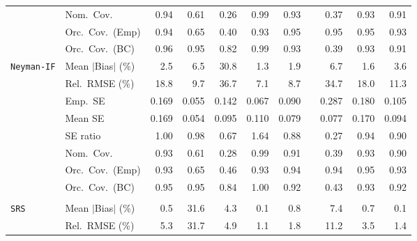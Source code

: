 \begin{landscape}
\begin{longtable}{llrrrrrrrrr}
 & Nom.\ Cov. & \cellcolor{rankone}0.94 & 0.61 & 0.26 & \cellcolor{rankthree}0.99 & \cellcolor{ranktwo}0.93 &  & 0.37 & \cellcolor{ranktwo}0.93 & \cellcolor{rankthree}0.91 \\
 & Orc.\ Cov.\ (Emp) & \cellcolor{ranktwo}0.94 & 0.65 & 0.40 & \cellcolor{rankthree}0.93 & \cellcolor{rankone}0.95 &  & \cellcolor{rankone}0.95 & \cellcolor{rankone}0.95 & \cellcolor{rankthree}0.93 \\
 & Orc.\ Cov.\ (BC) & \cellcolor{ranktwo}0.96 & \cellcolor{rankone}0.95 & 0.82 & 0.99 & \cellcolor{rankthree}0.93 &  & 0.39 & \cellcolor{rankthree}0.93 & 0.91 \\
\addlinespace[2pt]
\quad \texttt{Neyman-IF} & Mean $|$Bias$|$ (\%) & 2.5 & 6.5 & 30.8 & \cellcolor{rankone}1.3 & \cellcolor{rankthree}1.9 &  & 6.7 & \cellcolor{ranktwo}1.6 & 3.6 \\
 & Rel.\ RMSE (\%) & 18.8 & \cellcolor{rankthree}9.7 & 36.7 & \cellcolor{rankone}7.1 & \cellcolor{ranktwo}8.7 &  & 34.7 & 18.0 & 11.3 \\
 & Emp.\ SE & 0.169 & 0.055 & 0.142 & 0.067 & 0.090 &  & 0.287 & 0.180 & 0.105 \\
 & Mean SE & 0.169 & 0.054 & 0.095 & 0.110 & 0.079 &  & 0.077 & 0.170 & 0.094 \\
 & SE ratio & \cellcolor{rankone}1.00 & \cellcolor{ranktwo}0.98 & 0.67 & 1.64 & 0.88 &  & 0.27 & \cellcolor{rankthree}0.94 & 0.90 \\
 & Nom.\ Cov. & \cellcolor{rankone}0.93 & 0.61 & 0.28 & \cellcolor{ranktwo}0.99 & \cellcolor{ranktwo}0.91 &  & 0.39 & \cellcolor{rankone}0.93 & \cellcolor{rankthree}0.90 \\
 & Orc.\ Cov.\ (Emp) & \cellcolor{rankthree}0.93 & 0.65 & 0.46 & \cellcolor{rankthree}0.93 & \cellcolor{ranktwo}0.94 &  & \cellcolor{ranktwo}0.94 & \cellcolor{rankone}0.95 & \cellcolor{rankthree}0.93 \\
 & Orc.\ Cov.\ (BC) & \cellcolor{rankone}0.95 & \cellcolor{rankone}0.95 & 0.84 & 1.00 & \cellcolor{rankthree}0.92 &  & 0.43 & \cellcolor{ranktwo}0.93 & \cellcolor{rankthree}0.92 \\
\addlinespace[2pt]
\multicolumn{11}{l}{\textbf{Continuous Phase-One Covariates}} \\
\addlinespace[2pt]
\quad \texttt{SRS} & Mean $|$Bias$|$ (\%) & \cellcolor{ranktwo}0.5 & 31.6 & 4.3 & \cellcolor{rankone}0.1 & 0.8 &  & 7.4 & \cellcolor{rankthree}0.7 & \cellcolor{rankone}0.1 \\
 & Rel.\ RMSE (\%) & 5.3 & 31.7 & 4.9 & \cellcolor{rankone}1.1 & \cellcolor{rankthree}1.8 &  & 11.2 & 3.5 & \cellcolor{ranktwo}1.4 \\

\end{longtable}
\end{landscape}
